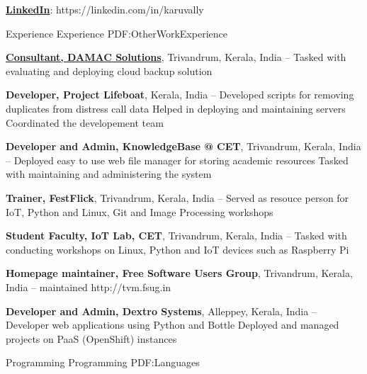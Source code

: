 \documentclass[letterpaper,MMMyyyy,nonstopmode]{simpleresumecv}
\begin{document}
\begin{Body}
\BigGap
\Entry
\BulletItem
\href{https://linkedin.com/in/karuvally}
{\textbf{LinkedIn}}:
https://linkedin.com/in/karuvally


\BigGap
\Section
{Experience}
{Experience}
{PDF:OtherWorkExperience}

\Entry
\href{http://damacsolutions.com}
{\textbf{Consultant, DAMAC Solutions}},
Trivandrum, Kerala, India
\hfill
{} -- 
\Gap
\BulletItem
Tasked with evaluating and deploying cloud backup solution

\BigGap
\Entry
{\textbf{Developer, Project Lifeboat}},
Kerala, India
\hfill
{} -- 
\Gap
\BulletItem
Developed scripts for removing duplicates from distress call data
\BulletItem
Helped in deploying and maintaining servers
\BulletItem
Coordinated the developement team

\BigGap
\Entry
{\textbf{Developer and Admin, KnowledgeBase @ CET}},
Trivandrum, Kerala, India
\hfill
{} -- 
\Gap
\BulletItem
Deployed easy to use web file manager for storing academic resources 
\BulletItem
Tasked with maintaining and administering the system

\BigGap
\Entry
{\textbf{Trainer, FestFlick}},
Trivandrum, Kerala, India
\hfill
{} -- 
\Gap
\BulletItem
Served as resouce person for IoT, Python and Linux, Git and Image Processing
workshops

\BigGap
\Entry
{\textbf{Student Faculty, IoT Lab, CET}},
Trivandrum, Kerala, India
\hfill
{} -- 
\Gap
\BulletItem
Tasked with conducting workshops on Linux, Python and IoT devices such as
Raspberry Pi

\BigGap
\Entry
{\textbf{Homepage maintainer, Free Software Users Group}},
Trivandrum, Kerala, India
\hfill
{} -- 
\Gap
\BulletItem
maintained http://tvm.fsug.in

\BigGap
\Entry
{\textbf{Developer and Admin, Dextro Systems}},
Alleppey, Kerala, India
\hfill
{} -- 
\Gap
\BulletItem
Developer web applications using Python and Bottle
\BulletItem
Deployed and managed projects on PaaS (OpenShift) instances 

\BigGap
\Section
{Programming}
{Programming}
{PDF:Languages}


\end{Body}
\end{document}
